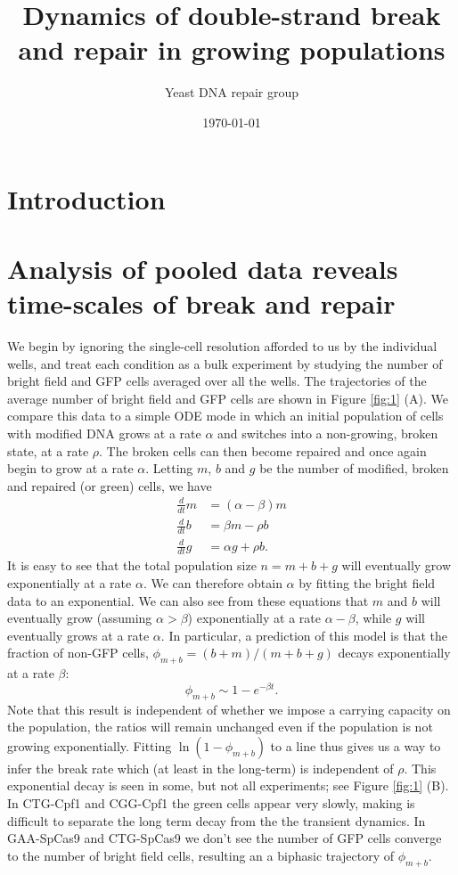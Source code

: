 \documentclass{article}
\author[1]{Yeast DNA repair group}
\title{Dynamics of double-strand break and repair in growing populations}
\date{\today}
\makeatletter
\renewcommand{\maketitle}{\bgroup\setlength{\parindent}{0pt}
\begin{flushleft}
  \textbf{\LARGE \@title}

  \@author
\end{flushleft}\egroup
}
\makeatother
\begin{document}
\maketitle
\tableofcontents

\section{Introduction}

\section{Analysis of pooled data reveals time-scales of break and repair}
We begin by ignoring the single-cell resolution afforded to us by the individual wells, and treat each condition as a bulk experiment by studying the number of bright field and GFP cells averaged over all the wells. The trajectories of the average number of bright field and GFP cells are shown in Figure \ref{fig:1} (A). We compare this data to a simple ODE mode in which an initial population of cells with modified DNA grows at a rate $\alpha$ and switches into a non-growing, broken state, at a rate $\rho$. The broken cells can then become repaired and once again begin to grow at a rate $\alpha$. Letting $m$, $b$ and $g$ be the number of modified, broken and repaired (or green) cells, we have
\begin{align}\label{mbg_ode}
\frac{d}{dt}m &= (\alpha - \beta) m\\
\frac{d}{dt}b &= \beta m - \rho b\\
\frac{d}{dt}g &= \alpha g + \rho b.
\end{align}
It is easy to see that the total population size $n = m+b+g$ will eventually grow exponentially at a rate $\alpha$. We can therefore obtain $\alpha$ by fitting the bright field data to an exponential. We can also see from these equations that $m$ and $b$ will eventually grow (assuming $\alpha> \beta$) exponentially at a rate $\alpha-\beta$, while $g$ will eventually grows at a rate $\alpha$. 
In particular, a prediction of this model is that the fraction of  non-GFP cells, $\phi_{m+b} = (b+m)/(m+b+g)$  decays exponentially at a rate $\beta$:
\begin{equation}
\phi_{m+b} \sim 1- e^{-\beta t}. 
\end{equation}
Note that this result is independent of whether we impose a carrying capacity on the population, the ratios will remain unchanged even if the population is not growing exponentially. 
Fitting $\ln (1-\phi_{m+b})$ to a line thus gives us a way to infer the break rate which (at least in the long-term) is independent of $\rho$. 
This exponential decay is seen in some, but not all experiments; see Figure \ref{fig:1} (B). In CTG-Cpf1 and CGG-Cpf1 the green cells appear very slowly, making is difficult to separate the long term decay from the the transient dynamics. In GAA-SpCas9 and CTG-SpCas9 we don't see the number of GFP cells converge to the number of bright field cells, resulting an a biphasic trajectory of $\phi_{m+b}$. 
\end{document}
